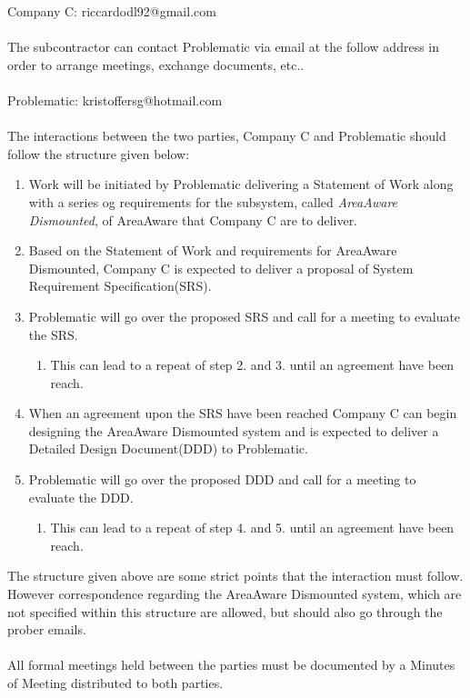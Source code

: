 Company C: riccardodl92@gmail.com\\\\

\noindent The subcontractor can contact Problematic via email at the follow address in order to arrange meetings, exchange documents, etc..\\\\

Problematic: kristoffersg@hotmail.com\\\\

\noindent The interactions between the two parties, Company C and Problematic should follow the structure given below:
\begin{enumerate}
    \item Work will be initiated by Problematic delivering a Statement of Work along with a series og requirements for the subsystem, called \emph{AreaAware Dismounted}, of AreaAware that Company C are to deliver.
    \item Based on the Statement of Work and requirements for AreaAware Dismounted, Company C is expected to deliver a proposal of System Requirement Specification(SRS).
    \item Problematic will go over the proposed SRS and call for a meeting to evaluate the SRS.
    \begin{enumerate}
        \item This can lead to a repeat of step 2. and 3. until an agreement have been reach.
    \end{enumerate}
    \item When an agreement upon the SRS have been reached Company C can begin designing the AreaAware Dismounted system and is expected to deliver a Detailed Design Document(DDD) to Problematic.
    \item Problematic will go over the proposed DDD and call for a meeting to evaluate the DDD.
    \begin{enumerate}
        \item This can lead to a repeat of step 4. and 5. until an agreement have been reach.
    \end{enumerate}
\end{enumerate}
The structure given above are some strict points that the interaction must follow.
However correspondence regarding the AreaAware Dismounted system, which are not specified within this structure are allowed, but should also go through the prober emails.\\\\
All formal meetings held between the parties must be documented by a Minutes of Meeting distributed to both parties.

